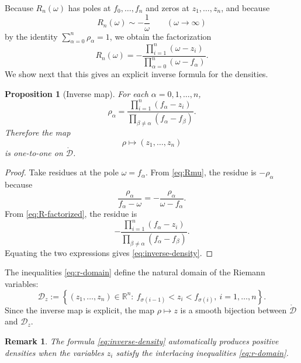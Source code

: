 \documentclass[12pt]{article}
\newtheorem{proposition}[theorem]{Proposition}
\newtheorem{remark}[theorem]{Remark}
\newcommand{\R}{{\mathbb R}}
\begin{document}
Because $R_n(\omega)$ has poles at $f_0,\dots,f_n$ and zeros at $z_1,\dots,z_n$, and because
\[
R_n(\omega)\sim -\frac{1}{\omega}
\qquad (\omega\to\infty)
\]
by the identity $\sum_{\alpha=0}^n \rho_\alpha=1$, we obtain the factorization
\begin{equation}
R_n(\omega) = -\frac{\prod_{i=1}^n (\omega-z_i)}{\prod_{\alpha=0}^n (\omega-f_\alpha)}.
\label{eq:R-factorized}
\end{equation}
We show next that this gives an explicit inverse formula for the densities.
\begin{proposition}[Inverse map]
For each $\alpha=0,1,\dots,n$,
\begin{equation}
\rho_\alpha
=
\frac{\prod_{i=1}^n (f_\alpha-z_i)}{\prod_{\beta\ne\alpha}(f_\alpha-f_\beta)}.
\label{eq:inverse-density}
\end{equation}
Therefore the map
\[
\rho\longmapsto (z_1,\dots,z_n)
\]
is one-to-one on $\mathring{\mathcal D}$.
\end{proposition}

\begin{proof}
Take residues at the pole $\omega=f_\alpha$. From \eqref{eq:Rmu}, the residue is $-\rho_\alpha$ because
\[
\frac{\rho_\alpha}{f_\alpha-\omega}=-\frac{\rho_\alpha}{\omega-f_\alpha}.
\]
From \eqref{eq:R-factorized}, the residue is
\[
-\frac{\prod_{i=1}^n (f_\alpha-z_i)}{\prod_{\beta\ne\alpha}(f_\alpha-f_\beta)}.
\]
Equating the two expressions gives \eqref{eq:inverse-density}.
\end{proof}

The inequalities \eqref{eq:r-domain} define the natural domain of the Riemann variables:
\[
\mathcal D_z
:=
\left\{(z_1,\dots,z_n)\in\R^n:\ f_{\sigma(i-1)}<z_i<f_{\sigma(i)},\ i=1,\dots,n\right\}.
\]
Since the inverse map is explicit, the map $\rho\mapsto z$ is a smooth bijection between $\mathring{\mathcal D}$ and $\mathcal D_z$.

\begin{remark}
The formula \eqref{eq:inverse-density} automatically produces positive densities when the variables $z_i$ satisfy the interlacing inequalities \eqref{eq:r-domain}.
\end{remark}
\end{document}
